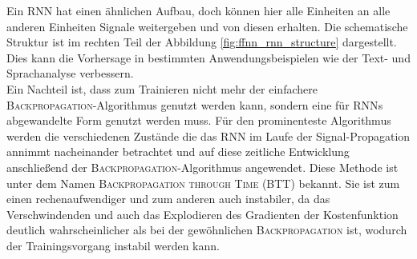 Ein \textsc{RNN} hat einen ähnlichen Aufbau, doch können hier alle Einheiten an alle anderen Einheiten Signale weitergeben und von diesen erhalten. Die schematische Struktur ist im rechten Teil der Abbildung \ref{fig:ffnn_rnn_structure} dargestellt. Dies kann die Vorhersage in bestimmten Anwendungsbeispielen wie der Text- und Sprachanalyse verbessern.\\
Ein Nachteil ist, dass zum Trainieren nicht mehr der einfachere \textsc{Backpropagation}-Algorithmus genutzt werden kann, sondern eine für \textsc{RNN}s abgewandelte Form genutzt werden muss. Für den prominenteste Algorithmus werden die verschiedenen Zustände die das \textsc{RNN} im Laufe der Signal-Propagation annimmt nacheinander betrachtet und auf diese zeitliche Entwicklung anschließend der \textsc{Backpropagation}-Algorithmus angewendet. Diese Methode ist unter dem Namen \textsc{Backpropagation through Time} (BTT) bekannt. Sie ist zum einen rechenaufwendiger und zum anderen auch instabiler, da das Verschwindenden und auch das Explodieren des Gradienten der Kostenfunktion deutlich wahrscheinlicher als bei der gewöhnlichen \textsc{Backpropagation} ist, wodurch der Trainingsvorgang instabil werden kann\citep{pascanu, jeagerTut2002}.
